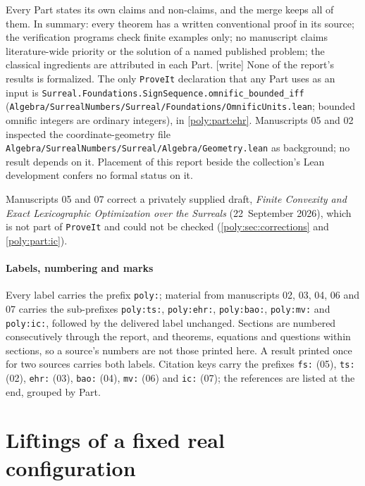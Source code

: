 \documentclass[11pt,a4paper]{article}
\numberwithin{equation}{section}
\theoremstyle{plain}
\newcommand{\wtag}{\textup{[write]}}%
\newcommand{\repo}{\texttt{ProveIt}}
\begin{document}
Every Part states its own claims and non-claims, and the merge keeps all of
them. In summary: every theorem has a written conventional proof in its
source; the verification programs check finite examples only; no
manuscript claims literature-wide priority or the solution of a named
published problem; the classical ingredients are attributed in each Part.
\wtag{} None of the report's results is formalized. The only \repo{}
declaration that any Part uses as an input is
\texttt{Surreal.Foundations.SignSequence.omnific\_bounded\_iff}
(\nolinkurl{Algebra/SurrealNumbers/Surreal/Foundations/OmnificUnits.lean};
bounded omnific integers are ordinary integers), in \cref{poly:part:ehr}.
Manuscripts 05 and 02 inspected the coordinate-geometry file
\nolinkurl{Algebra/SurrealNumbers/Surreal/Algebra/Geometry.lean} as
background; no result depends on it. Placement of this report beside the
collection's Lean development confers no formal status on it.

Manuscripts 05 and 07 correct a privately supplied draft, \emph{Finite
Convexity and Exact Lexicographic Optimization over the Surreals}
(22~September 2026), which is not part of \repo{} and could not be checked
(\cref{poly:sec:corrections} and \cref{poly:part:ic}).

\subsection{Labels, numbering and marks}

Every label carries the prefix \texttt{poly:}; material from manuscripts
02, 03, 04, 06 and 07 carries the sub-prefixes \texttt{poly:ts:},
\texttt{poly:ehr:}, \texttt{poly:bao:}, \texttt{poly:mv:} and
\texttt{poly:ic:}, followed by the delivered label unchanged. Sections are
numbered consecutively through the report, and theorems, equations and
questions within sections, so a source's numbers are not those printed
here. A result printed once for two sources carries both labels. Citation
keys carry the prefixes \texttt{fs:} (05), \texttt{ts:} (02),
\texttt{ehr:} (03), \texttt{bao:} (04), \texttt{mv:} (06) and \texttt{ic:}
(07); the references are listed at the end, grouped by Part.

\part{Liftings of a fixed real configuration}\label{poly:part:lift}
\end{document}
